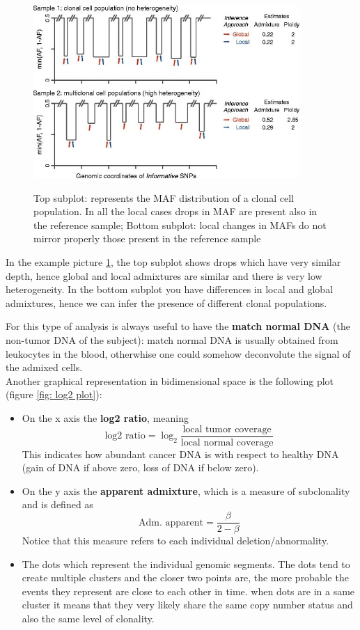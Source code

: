   \begin{figure}[H]
    \caption{ Top subplot: represents the MAF distribution of a clonal cell
      population. In all the local cases drops in MAF are present also in the
      reference sample; Bottom subplot: local changes in MAFs do not mirror
      properly those present in the reference sample }
    \centering
    \includegraphics[width=0.9\textwidth]{image_03.jpg}
    \label{fig: local globla admixture}
  \end{figure}

  In the example picture \ref*{fig: local globla admixture}, the top subplot
  shows drops which have very similar depth, hence global and local admixtures
  are similar and there is very low heterogeneity. In the bottom subplot you
  have differences in local and global admixtures, hence we can infer the
  presence of different clonal populations. 
  
  For this type of analysis is always useful to have the \textbf{match normal
  DNA} (the non-tumor DNA of the subject): match normal DNA is usually obtained
  from leukocytes in the blood, otherwhise one could somehow deconvolute the
  signal of the admixed cells. \\

  Another graphical representation in bidimensional space is the following plot
  (figure \ref{fig: log2 plot}):
  \begin{itemize}
    \item On the x axis the \textbf{log2 ratio}, meaning 
      $$
      \text{log2 ratio} = \log_2\frac{\text{local tumor coverage}}{\text{local normal coverage}}
      $$ 
      This indicates how abundant cancer DNA is with respect to healthy DNA
      (gain of DNA if above zero, loss of DNA if below zero).
    \item On the y axis the \textbf{apparent admixture}, which is a measure of
    subclonality and is defined as
      $$
      \text{Adm. apparent} = \frac{\beta}{2 - \beta}
      $$
      Notice that this measure refers to each individual deletion/abnormality.
    \item The dots which represent the individual genomic segments. The dots
    tend to create multiple clusters and the closer two points are, the more
    probable the events they represent are close to each other in time. when
    dots are in a same cluster it means that they very likely share the same
    copy number status and also the same level of clonality.
  \end{itemize}
  
